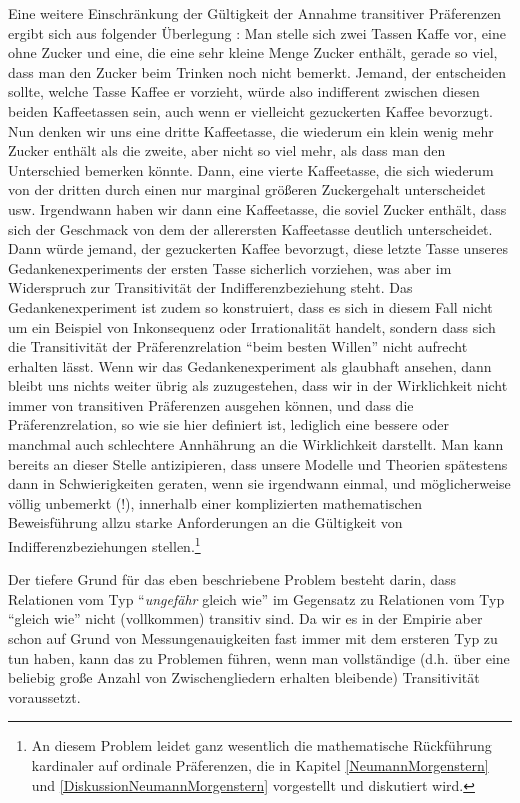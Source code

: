 Eine weitere Einschränkung der Gültigkeit der Annahme transitiver Präferenzen
ergibt sich aus folgender Überlegung \cite[p. 23/24]{resnik:1987}:
 Man stelle sich zwei Tassen Kaffe vor, eine ohne Zucker und eine, die eine sehr
 kleine Menge Zucker enthält, gerade so viel, dass man den Zucker beim Trinken
 noch nicht
bemerkt. Jemand, der entscheiden sollte, welche Tasse Kaffee er vorzieht, würde
also indifferent zwischen diesen beiden Kaffeetassen sein, auch wenn er
vielleicht gezuckerten Kaffee bevorzugt. Nun denken wir uns eine dritte
Kaffeetasse, die wiederum ein klein wenig mehr Zucker enthält als die zweite,
aber nicht so viel mehr, als dass man den Unterschied bemerken könnte. Dann, eine
vierte Kaffeetasse, die sich wiederum von der dritten durch einen nur marginal
größeren Zuckergehalt unterscheidet usw. Irgendwann haben wir dann eine
Kaffeetasse, die soviel Zucker enthält, dass sich der Geschmack von dem der
allerersten Kaffeetasse deutlich unterscheidet. Dann würde jemand, der
gezuckerten Kaffee bevorzugt, diese letzte Tasse unseres Gedankenexperiments der
ersten Tasse sicherlich vorziehen, was aber im Widerspruch zur Transitivität der
Indifferenzbeziehung steht. Das Gedankenexperiment ist zudem so konstruiert, dass
es sich in diesem Fall nicht um ein Beispiel von Inkonsequenz oder Irrationalität
handelt, sondern dass sich die Transitivität der Präferenzrelation "`beim besten
Willen"' nicht aufrecht erhalten lässt. Wenn wir das Gedankenexperiment als
glaubhaft ansehen, dann bleibt uns nichts weiter übrig als zuzugestehen, dass wir
in der Wirklichkeit nicht immer von transitiven Präferenzen ausgehen können, und
dass die Präferenzrelation, so wie sie hier definiert ist, lediglich eine bessere
oder manchmal auch schlechtere Annhährung an die Wirklichkeit darstellt. Man kann
bereits an dieser Stelle antizipieren, dass unsere Modelle und Theorien
spätestens dann in Schwierigkeiten geraten, wenn sie irgendwann einmal, und
möglicherweise völlig unbemerkt (!), innerhalb einer komplizierten mathematischen
Beweisführung allzu starke Anforderungen an die Gültigkeit von
Indifferenzbeziehungen stellen.\footnote{An diesem Problem leidet ganz wesentlich
die mathematische Rückführung kardinaler auf ordinale Präferenzen, die in Kapitel
\ref{NeumannMorgenstern} und
\ref{DiskussionNeumannMorgenstern} vorgestellt und diskutiert wird.}
 
Der tiefere Grund für das eben beschriebene Problem besteht darin, dass
Relationen vom Typ "`{\em ungefähr} gleich wie"' im Gegensatz zu Relationen vom
Typ "`gleich wie"' nicht (vollkommen) transitiv sind. Da wir es in der Empirie
aber schon auf Grund von Messungenauigkeiten fast immer mit dem ersteren Typ zu
tun haben, kann das zu Problemen führen, wenn man vollständige (d.h. über eine
beliebig große Anzahl von Zwischengliedern erhalten bleibende) Transitivität
voraussetzt.

